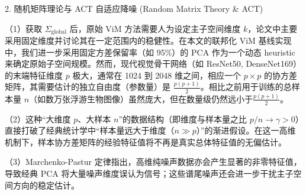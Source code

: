 \documentclass[11pt,aspectratio=169]{beamer}
\begin{document}
\begin{frame}[t]{2. 随机矩阵理论与 ACT 自适应降噪 (Random Matrix Theory \& ACT)}
  \small

  \hspace{2em}（1）获取 $\Sigma_{\mathrm{global}}$ 后，原始 ViM 方法需要人为设定主子空间维度 $k$，论文中主要采用固定维度并讨论其在一定范围内的稳健性。在本文的联邦化 ViM 基线实现中，我们进一步采用固定方差保留率（如 95\%）的 PCA 作为一个动态 heuristic 来确定原始子空间规模。然而，现代视觉骨干网络（如 ResNet50, DenseNet169）的末端特征维度 $p$ 极大，通常在 1024 到 2048 维之间，相应一个 $p \times p$ 的协方差矩阵，其需要估计的独立自由度（参数量）是 $\frac{p(p+1)}{2}$。相比之前用于训练的总样本量 $n$（如数万张浮游生物图像）虽然庞大，但在数量级仍然远小于$\frac{p(p+1)}{2}$。\par\vspace{0.4em}
\par \hspace{2em}（2）这种“大维度 $p$、大样本 $n$”的数据结构（即维度与样本量之比 $p/n \to \gamma > 0$）直接打破了经典统计学中“样本量远大于维度（$n \gg p$）”的渐进假设。在这一高维机制下，样本协方差矩阵的经验特征值将不再是真实总体特征值的无偏估计。\par\vspace{0.4em}
\par \hspace{2em}（3）Marchenko-Pastur 定律指出，高维纯噪声数据亦会产生显著的非零特征值，导致经典 PCA 将大量噪声维度误认为信号；这些谱尾噪声还会进一步干扰主子空间方向的稳定估计。\par\vspace{0.4em}
  \end{frame}
  
  
  
\end{document}
